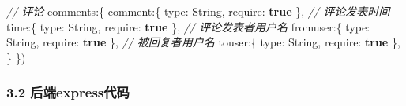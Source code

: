 \documentclass[]{article}
\newenvironment{Shaded}{}{}
\newcommand{\CommentTok}[1]{\textcolor[rgb]{0.38,0.63,0.69}{\textit{#1}}}
\newcommand{\DataTypeTok}[1]{\textcolor[rgb]{0.56,0.13,0.00}{#1}}
\newcommand{\KeywordTok}[1]{\textcolor[rgb]{0.00,0.44,0.13}{\textbf{#1}}}
\newcommand{\NormalTok}[1]{#1}
\newcommand{\OperatorTok}[1]{\textcolor[rgb]{0.40,0.40,0.40}{#1}}
\begin{document}
\begin{Shaded}
\begin{Highlighting}[]
  \CommentTok{// 评论}
  \DataTypeTok{comments}\OperatorTok{:\{}
    \DataTypeTok{comment}\OperatorTok{:\{}
      \DataTypeTok{type}\OperatorTok{:}\NormalTok{ String}\OperatorTok{,}
      \DataTypeTok{require}\OperatorTok{:} \KeywordTok{true}
    \OperatorTok{\},}
    \CommentTok{// 评论发表时间}
    \DataTypeTok{time}\OperatorTok{:\{}
      \DataTypeTok{type}\OperatorTok{:}\NormalTok{ String}\OperatorTok{,}
      \DataTypeTok{require}\OperatorTok{:} \KeywordTok{true}
    \OperatorTok{\},}
    \CommentTok{// 评论发表者用户名}
    \DataTypeTok{fromuser}\OperatorTok{:\{}
      \DataTypeTok{type}\OperatorTok{:}\NormalTok{ String}\OperatorTok{,}
      \DataTypeTok{require}\OperatorTok{:} \KeywordTok{true}
    \OperatorTok{\},}
    \CommentTok{// 被回复者用户名}
    \DataTypeTok{touser}\OperatorTok{:\{}
      \DataTypeTok{type}\OperatorTok{:}\NormalTok{ String}\OperatorTok{,}
      \DataTypeTok{require}\OperatorTok{:} \KeywordTok{true}
    \OperatorTok{\},}
  \OperatorTok{\}}
\OperatorTok{\}}\NormalTok{)}
\end{Highlighting}
\end{Shaded}

\hypertarget{header-n171}{%
\subsubsection{3.2 后端express代码}\label{header-n171}}
\end{document}
